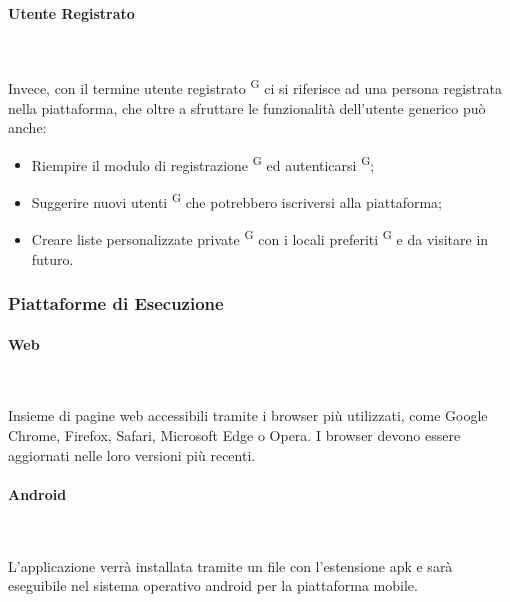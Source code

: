 \documentclass[letterpaper]{article}
\begin{document}
\paragraph{Utente Registrato} \ \par\bigskip

Invece, con il termine utente registrato \textsuperscript{G} ci si riferisce ad una persona registrata nella piattaforma, che oltre a sfruttare le funzionalità dell’utente generico può anche:

\begin{itemize}
  \item Riempire il modulo di registrazione \textsuperscript{G} ed autenticarsi \textsuperscript{G};
  \item Suggerire nuovi utenti \textsuperscript{G} che potrebbero iscriversi alla piattaforma;
  \item Creare liste personalizzate private \textsuperscript{G} con i locali preferiti \textsuperscript{G} e da visitare in futuro.
\end{itemize}

\subsubsection{Piattaforme di Esecuzione}

\paragraph{Web} \ \par\bigskip
Insieme di pagine web accessibili tramite i browser più utilizzati, come Google Chrome, Firefox, Safari, Microsoft Edge o Opera. I browser devono essere aggiornati nelle loro versioni più recenti.

\paragraph{Android} \ \par\bigskip
L'applicazione verrà installata tramite un file con l’estensione apk e sarà eseguibile nel sistema operativo android per la piattaforma mobile.
\end{document}
